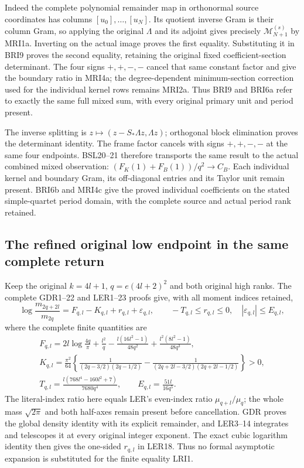 \documentclass[11pt,a4paper]{article}
\begin{document}
Indeed the complete polynomial remainder map in orthonormal
source coordinates has columns $[u_0],\ldots,[u_N]$.
Its quotient inverse Gram is their column Gram, so applying
the original $\Lambda$ and its adjoint gives precisely
$\mathcal M_{N+1}^{(s)}$ by MRI1a. Inverting on the actual
image proves the first equality. Substituting it in BRI9
proves the second equality, retaining the original fixed
coefficient-section determinant. The four signs
$+,+,-,-$ cancel that same constant factor and give the
boundary ratio in MRI4a; the degree-dependent minimum-section
correction used for the individual kernel rows remains MRI2a.
Thus BRI9 and BRI6a refer to exactly the same full mixed sum,
with every original primary unit and period present.

The inverse splitting is $z\mapsto(z-S_*\Lambda z,\Lambda z)$;
orthogonal block elimination proves the determinant identity.
The frame factor cancels with signs $+,+,-,-$ at the same four
endpoints. BSL20--21 therefore transports the same result to the
actual combined mixed observation:
$(F_K(1)+F_B(1))/q^2\to C_B$. Each individual kernel and
boundary Gram, its off-diagonal entries and its Taylor unit
remain present. BRI6b and MRI4c give the proved individual
coefficients on the stated simple-quartet period domain, with the
complete source and actual period rank retained.


\subsection{The refined original low endpoint in the same complete return}

Keep the original $k=4l+1$, $q=e(4l+2)^2$ and both original
high ranks. The complete GDR1--22 and LER1--23 proofs give,
with all moment indices retained,
\[
 \log\frac{m_{2q+2l}}{m_{2q}}
 =F_{q,l}-K_{q,l}+r_{q,l}+\varepsilon_{q,l},\qquad
 -T_{q,l}\leq r_{q,l}\leq0,\quad
 |\varepsilon_{q,l}|\leq E_{q,l},
 \tag{LRI1}
\]
where the complete finite quantities are
\[
\begin{gathered}
 F_{q,l}=2l\log\frac{4q}{\pi}+\frac{l^2}{q}
 -\frac{l(16l^2-1)}{48q^2}
 +\frac{l^2(8l^2-1)}{48q^3},\\
 K_{q,l}=\frac{\pi^2}{64}\left\{
 \frac1{(2q-3/2)(2q-1/2)}
 -\frac1{(2q+2l-3/2)(2q+2l-1/2)}\right\}>0,\\
 T_{q,l}=\frac{l(768l^4-160l^2+7)}{7680q^4},\qquad
 E_{q,l}=\frac{51l}{16q^5}.
\end{gathered}\tag{LRI2}
\]
The literal-index ratio here equals LER's even-index ratio
$\mu_{q+l}/\mu_q$; the whole mass $\sqrt{2\pi}$ and both
half-axes remain present before cancellation. GDR proves the
global density identity with its explicit remainder, and LER3--14
integrates and telescopes it at every original integer exponent.
The exact cubic logarithm identity then gives the one-sided
$r_{q,l}$ in LER18. Thus no formal asymptotic expansion is
substituted for the finite equality LRI1.
\end{document}

